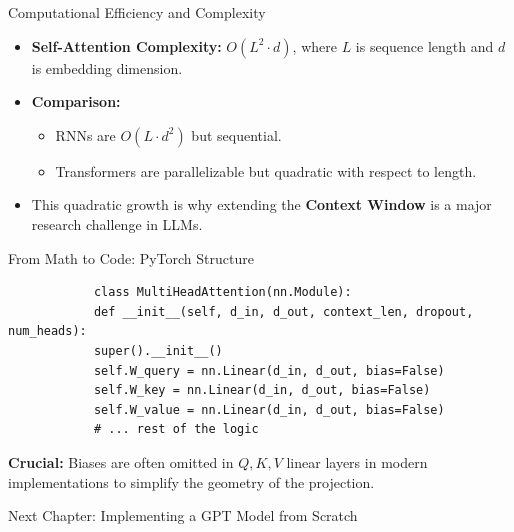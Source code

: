 \documentclass[aspectratio=169]{beamer}
\begin{document}
	\begin{frame}{Computational Efficiency and Complexity}
		\begin{itemize}
			\item \textbf{Self-Attention Complexity:} $O(L^2 \cdot d)$, where $L$ is sequence length and $d$ is embedding dimension.
			\item \textbf{Comparison:} 
			\begin{itemize}
				\item RNNs are $O(L \cdot d^2)$ but sequential.
				\item Transformers are parallelizable but quadratic with respect to length.
			\end{itemize}
			\item This quadratic growth is why extending the \textbf{Context Window} is a major research challenge in LLMs.
		\end{itemize}
	\end{frame}
	
	\begin{frame}[fragile]{From Math to Code: PyTorch Structure}
		\begin{lstlisting}
			class MultiHeadAttention(nn.Module):
			def __init__(self, d_in, d_out, context_len, dropout, num_heads):
			super().__init__()
			self.W_query = nn.Linear(d_in, d_out, bias=False)
			self.W_key = nn.Linear(d_in, d_out, bias=False)
			self.W_value = nn.Linear(d_in, d_out, bias=False)
			# ... rest of the logic
		\end{lstlisting}
		\textbf{Crucial:} Biases are often omitted in $Q, K, V$ linear layers in modern implementations to simplify the geometry of the projection.
	\end{frame}
	
	\begin{frame}[standout]
		Next Chapter: Implementing a GPT Model from Scratch
	\end{frame}
	
\end{document}
